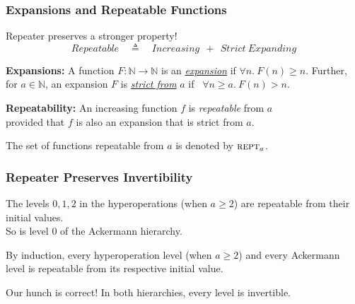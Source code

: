 \begin{frame}
\frametitle{Expansions and Repeatable Functions}

%
%
%

Repeater preserves a stronger property!
\begin{equation*}
Repeatable \quad \triangleq \quad Increasing~~+~~Strict \ Expanding
\end{equation*}

\textbf{Expansions:} A function $F:\mathbb{N}\to\mathbb{N}$ is an
\href{https://github.com/inv-ack/inv-ack/blob/7270e64a2600b771f2b1b1b151f7d13fb2ae6c97/increasing_expanding.v\#L80-L82}{\emph{expansion}} if $\forall n.~ F(n)\ge n$. Further, for $a\in \mathbb{N}$, an expansion $F$ is
\href{https://github.com/inv-ack/inv-ack/blob/7270e64a2600b771f2b1b1b151f7d13fb2ae6c97/increasing_expanding.v\#L84-L86}{\emph{strict from}} $a$ if ~$\forall n \ge a.~ F(n) > n$.

\bigskip

\textbf{Repeatability:} An increasing function $f$ is \emph{repeatable} from $a$ \\provided that $f$ is also an expansion that is strict from $a$.

\smallskip

The set of functions repeatable from $a$ is denoted by $\text{\scshape{rept}}_a$.

\end{frame}


\begin{frame}
\frametitle{Repeater Preserves Invertibility}
\label{frame:repeatable2}


\bigskip

The levels $0, 1, 2$ in the hyperoperations (when $a\ge 2$) are repeatable from their initial values.\\
So is level $0$ of the Ackermann hierarchy. 

\bigskip

By induction, every hyperoperation level (when $a\ge 2$) and every Ackermann level is repeatable from its respective initial value.

\bigskip

Our hunch is correct! In both hierarchies, every level is invertible.

\end{frame}


